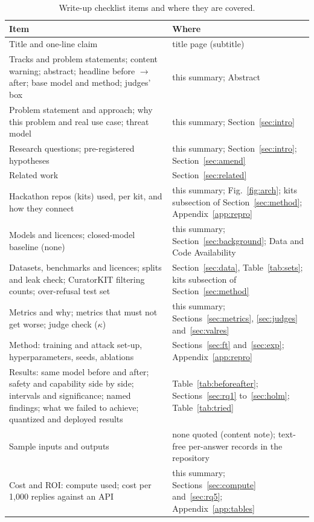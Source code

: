 \begin{table}[htbp]
\centering
\caption{Write-up checklist items and where they are covered.}\label{tab:checklist}
\scriptsize
\begin{tabular}{>{\raggedright\arraybackslash}p{5.3cm}>{\raggedright\arraybackslash}p{6.3cm}}
\toprule
Item & Where \\
\midrule
Title and one-line claim & title page (subtitle) \\
Tracks and problem statements; content warning; abstract; headline before $\to$ after; base model and method; judges' box & this summary; Abstract \\
Problem statement and approach; why this problem and real use case; threat model & this summary; Section~\ref{sec:intro} \\
Research questions; pre-registered hypotheses & this summary; Section~\ref{sec:intro}; Section~\ref{sec:amend} \\
Related work & Section~\ref{sec:related} \\
Hackathon repos (kits) used, per kit, and how they connect & this summary; Fig.~\ref{fig:arch}; kits subsection of Section~\ref{sec:method}; Appendix~\ref{app:repro} \\
Models and licences; closed-model baseline (none) & this summary; Section~\ref{sec:background}; Data and Code Availability \\
Datasets, benchmarks and licences; splits and leak check; CuratorKIT filtering counts; over-refusal test set & Section~\ref{sec:data}, Table~\ref{tab:sets}; kits subsection of Section~\ref{sec:method} \\
Metrics and why; metrics that must not get worse; judge check ($\kappa$) & this summary; Sections~\ref{sec:metrics}, \ref{sec:judges} and~\ref{sec:valres} \\
Method: training and attack set-up, hyperparameters, seeds, ablations & Sections~\ref{sec:ft} and~\ref{sec:exp}; Appendix~\ref{app:repro} \\
Results: same model before and after; safety and capability side by side; intervals and significance; named findings; what we failed to achieve; quantized and deployed results & Table~\ref{tab:beforeafter}; Sections~\ref{sec:rq1} to~\ref{sec:holm}; Table~\ref{tab:tried} \\
Sample inputs and outputs & none quoted (content note); text-free per-answer records in the repository \\
Cost and ROI: compute used; cost per 1,000 replies against an API & this summary; Sections~\ref{sec:compute} and~\ref{sec:rq5}; Appendix~\ref{app:tables} \\

\end{tabular}
\end{table}
